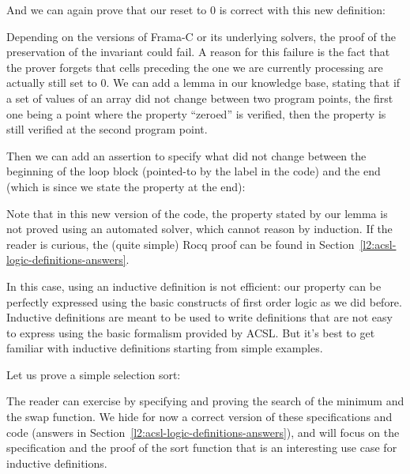 

And we can again prove that our reset to 0 is correct with this new
definition:


Depending on the versions of Frama-C or its underlying solvers, the proof of the
preservation of the invariant could fail. A reason for this failure is the fact that
the prover forgets that cells preceding the one we are currently processing
are actually still set to 0. We can add a lemma in our knowledge base, stating
that if a set of values of an array did not change between two program points,
the first one being a point where the property ``zeroed'' is verified,
then the property is still verified at the second program point.




Then we can add an assertion to specify what did not change between the
beginning of the loop block (pointed-to by the label  in the code)
and the end (which is  since we state the property at the end):




Note that in this new version of the code, the property stated by our lemma is
not proved using an automated solver, which cannot reason by induction. If the
reader is curious, the (quite simple) Rocq proof can be found
in Section~\ref{l2:acsl-logic-definitions-answers}.


In this case, using an inductive definition is not efficient: our
property can be perfectly expressed using the basic constructs of first
order logic as we did before. Inductive definitions are meant to be used to
write definitions that are not easy to express using the basic formalism
provided by ACSL. But it's best to get familiar with inductive
definitions starting from simple examples.



\label{l3:acsl-logic-definitions-inductive-sort}


Let us prove a simple selection sort:




The reader can exercise by specifying and proving the search of the minimum and
the swap function. We hide for now a correct version of these specifications and
code (answers in Section~\ref{l2:acsl-logic-definitions-answers}), and will focus on the
specification and the proof of the sort function that is an interesting use case
for inductive definitions.


